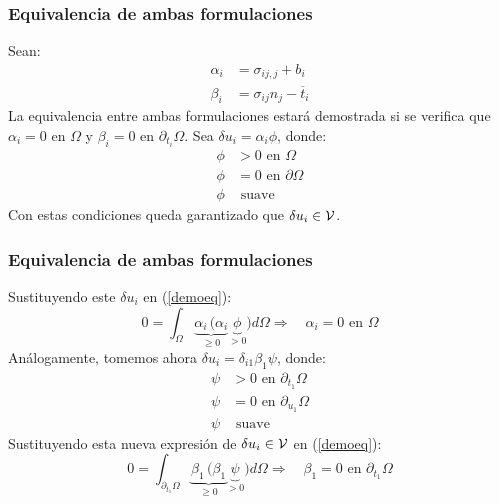 \documentclass{beamer}
\begin{document}
\begin{frame}
\frametitle{Equivalencia de ambas formulaciones}
Sean:
\begin{align}
\alpha_i&=\sigma_{ij,j}+b_i \\
\beta_i&=\sigma_{ij}n_j-\overline{t}_i
\end{align}
La equivalencia entre ambas formulaciones estará demostrada si se verifica
que $\alpha_i=0$ en $\Omega$ y $\beta_i=0$ en $\partial_{t_i} \Omega$.
Sea $\delta u_i=\alpha_i \phi$, donde:
\begin{align*}
\phi&>0 \textrm{ en } \Omega \\
\phi&=0 \textrm{ en } \partial \Omega \\
\phi& \textrm{ suave}
\end{align*}
Con estas condiciones queda garantizado que $\delta u_i \in {\cal V}$.
\end{frame}
\begin{frame}
\frametitle{Equivalencia de ambas formulaciones}
Sustituyendo este $\delta u_i$ en (\ref{demoeq}):
\begin{equation}
0=\int_{\Omega} \underbrace{\alpha_i \, (\alpha_i}_{\geq 0}
\underbrace{ \phi}_{>0}) d\Omega 
\Rightarrow \quad \alpha_i=0 \textrm{ en } \Omega
\end{equation}
Análogamente, tomemos ahora $\delta u_i=\delta_{i1} \beta_1 \psi$, donde:
\begin{align*}
\psi&>0 \textrm{ en } \partial_{t_1}\Omega \\
\psi&=0 \textrm{ en } \partial_{u_1} \Omega \\
\psi& \textrm{ suave}
\end{align*}
Sustituyendo esta nueva expresión de $\delta u_i \in {\cal V}$ en
(\ref{demoeq}):
\begin{equation}
0=\int_{\partial_{t_1} \Omega} \underbrace{\beta_1 \, (\beta_1}_{\geq 0}
\underbrace{ \psi}_{>0}) d\Omega 
\Rightarrow \quad \beta_1=0 \textrm{ en } \partial_{t_1} \Omega
\end{equation}
\end{frame}
\end{document}
